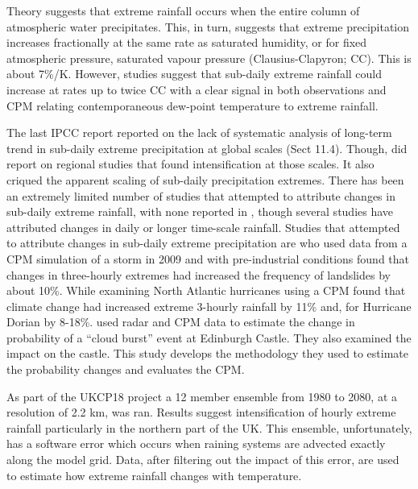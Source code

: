 \documentclass[11pt,a4paper]{article}
\begin{document}
Theory\parencite{allen02insight} suggests that extreme rainfall occurs when the entire column of atmospheric water precipitates. This, in turn,  suggests that extreme precipitation increases fractionally at the same rate as saturated humidity, or for fixed atmospheric pressure, saturated vapour pressure (Clausius-Clapyron; CC). This is about 7\%/K. However,  studies suggest that sub-daily extreme rainfall  could increase  at rates  up to twice CC\parencite{fowler2021rainfall_extremes} with a clear signal in both observations and CPM relating contemporaneous dew-point temperature to extreme rainfall. 

The last IPCC report\parencite{Seneviratne2021ippcc_chapter_extremes} reported on the lack of systematic analysis of long-term trend in sub-daily extreme precipitation at global scales (Sect 11.4). Though, did report on regional studies that found intensification at those scales. It also criqued the apparent scaling of sub-daily precipitation extremes. There has  been an extremely limited number of studies that attempted to attribute changes in sub-daily extreme rainfall, with none reported in \cite{Seneviratne2021ippcc_chapter_extremes},  though several studies have attributed changes in daily or longer time-scale rainfall\parencite{clarke2022extreme_Attribution,Zhang2020rainfall,tradowsky2023w_europe_rain}.  Studies that attempted to attribute changes in sub-daily extreme precipitation are \cite{mishra2023landslide} who used  data from a CPM simulation of a storm in 2009 and with pre-industrial conditions found that changes in three-hourly extremes had increased the frequency of landslides by about 10\%. While \cite{Reed2022,Reed2021dorian_extreme_rain} examining North Atlantic hurricanes  using a CPM found that climate change had increased extreme 3-hourly rainfall by 11\% and, for Hurricane Dorian by 8-18\%. \cite{tett2023edinburgh} used radar and CPM data to estimate the change in probability of a ``cloud burst'' event at Edinburgh Castle. They also examined the impact on the castle.  This study develops the methodology they used to estimate the probability changes and evaluates the CPM. 

  As part of the UKCP18 project\parencite{kendon2023uk_cpm} a 12 member ensemble from 1980 to 2080, at a resolution of 2.2 km, was ran. Results suggest intensification of hourly extreme rainfall particularly in the northern part of the UK.  This ensemble, unfortunately, has a software error which occurs when raining systems are advected exactly along the model grid.  Data, after filtering out the impact of this error, are used to estimate how extreme rainfall changes with temperature. 
 
\end{document}
